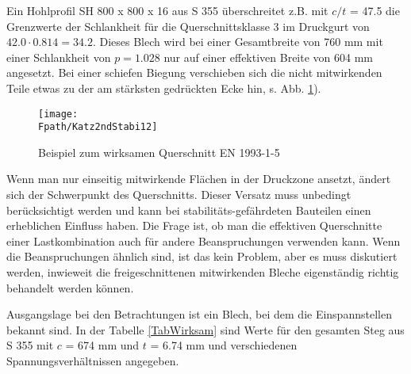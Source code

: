 Ein Hohlprofil SH 800 x 800 x 16 aus S 355 \"{u}berschreitet z.B. mit $c/t$ = 47.5 die Grenzwerte der Schlankheit f\"{u}r die Querschnittsklasse 3 im Druckgurt von $42.0\cdot 0.814 = 34.2$. Dieses Blech wird bei einer Gesamtbreite von 760 mm mit einer Schlankheit von $p=1.028 $ nur auf einer effektiven Breite von 604 mm angesetzt. Bei einer schiefen Biegung verschieben sich die nicht mitwirkenden Teile etwas zu der am st\"{a}rksten gedr\"{u}ckten Ecke hin, s. Abb. \ref{Katz2ndStabi12}).

\begin{figure}[tbp] \centering
\centering
\if {} \sidecaption[t] \fi
\texttt{[image: \\Fpath/Katz2ndStabi12]}
\caption{Beispiel zum wirksamen Querschnitt EN 1993-1-5
} \label{Katz2ndStabi12}
\end{figure}%

Wenn man nur einseitig mitwirkende Fl\"{a}chen in der Druckzone ansetzt, \"{a}ndert sich der Schwerpunkt des Querschnitts. Dieser Versatz muss unbedingt ber\"{u}cksichtigt werden und kann bei stabilit\"{a}ts-gef\"{a}hrdeten Bauteilen einen erheblichen Einfluss haben. Die Frage ist, ob man die effektiven Querschnitte einer Lastkombination auch f\"{u}r andere Beanspruchungen verwenden kann. Wenn die Beanspruchungen \"{a}hnlich sind, ist das kein Problem, aber es muss diskutiert werden, inwieweit die freigeschnittenen mitwirkenden Bleche eigenst\"{a}ndig richtig behandelt werden k\"{o}nnen.

Ausgangslage bei den Betrachtungen ist ein Blech, bei dem die Einspannstellen bekannt sind. In der Tabelle \ref{TabWirksam} sind Werte f\"{u}r den gesamten Steg aus S 355 mit $c$ = 674 mm und $t$ = 6.74 mm und verschiedenen Spannungsverh\"{a}ltnissen angegeben.

